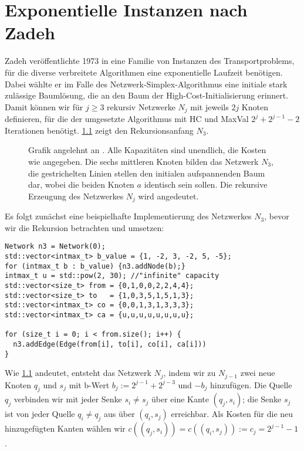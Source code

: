 \chapter{Exponentielle Instanzen nach Zadeh}\label{ch:lit}
Zadeh veröffentlichte 1973 in \cite{Exponential} eine Familie von Instanzen des Transportproblems, für die diverse verbreitete Algorithmen eine exponentielle Laufzeit benötigen. Dabei wählte er im Falle des Netzwerk-Simplex-Algorithmus eine initiale stark zulässige Baumlösung, die an den Baum der High-Cost-Initialisierung erinnert. Damit können wir für $j\geq 3$ rekursiv Netzwerke $N_j$ mit jeweils $2j$ Knoten definieren, für die der umgesetzte Algorithmus mit HC und MaxVal $2^j + 2^{j-1} - 2$ Iterationen benötigt. \cref{fig:N3} zeigt den Rekursionsanfang $N_3$.
\begin{figure}[!ht]\centering
    
    \caption{Grafik angelehnt an \cite[S. 261]{Exponential}. Alle Kapazitäten sind unendlich, die Kosten wie angegeben. Die sechs mittleren Knoten bilden das Netzwerk $N_3$, die gestrichelten Linien stellen den initialen aufspannenden Baum dar, wobei die beiden Knoten $a$ identisch sein sollen. Die rekursive Erzeugung des Netzwerkes $N_j$ wird angedeutet.}
    \label{fig:N3}
\end{figure}

Es folgt zunächst eine beispielhafte Implementierung des Netzwerkes $N_3$, bevor wir die Rekursion betrachten und umsetzen:

\begin{lstlisting}
Network n3 = Network(0);
std::vector<intmax_t> b_value = {1, -2, 3, -2, 5, -5};
for (intmax_t b : b_value) {n3.addNode(b);}
intmax_t u = std::pow(2, 30); //"infinite" capacity
std::vector<size_t> from = {0,1,0,0,2,2,4,4};
std::vector<size_t> to   = {1,0,3,5,1,5,1,3};
std::vector<intmax_t> co = {0,0,1,3,1,3,3,3};
std::vector<intmax_t> ca = {u,u,u,u,u,u,u,u};

for (size_t i = 0; i < from.size(); i++) {
  n3.addEdge(Edge(from[i], to[i], co[i], ca[i]))
}
\end{lstlisting}

Wie \cref{fig:N3} andeutet, entsteht das Netzwerk $N_j$, indem wir zu $N_{j-1}$ zwei neue Knoten $q_j$ und $s_j$ mit b-Wert $b_j:=2^{j-1} + 2^{j-3}$ und $-b_j$ hinzufügen. Die Quelle $q_j$ verbinden wir mit jeder Senke $s_i\neq s_j$ über eine Kante $(q_j,s_i)$; die Senke $s_j$ ist von jeder Quelle $q_i\neq q_j$ aus über $(q_i,s_j)$ erreichbar. Als Kosten für die neu hinzugefügten Kanten wählen wir $c((q_j,s_i))=c((q_i,s_j)):=c_j=2^{j-1}-1$.


